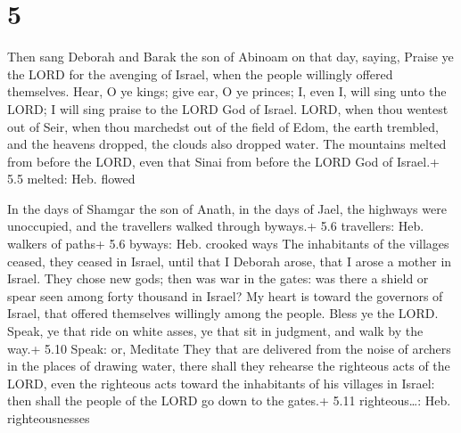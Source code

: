 \hypertarget{section-4}{%
\section{5}\label{section-4}}

 Then sang Deborah and Barak the son of Abinoam on that day,
saying,  Praise ye the LORD for the avenging of Israel, when
the people willingly offered themselves.  Hear, O ye kings;
give ear, O ye princes; I, even I, will sing unto the LORD; I will sing
praise to the LORD God of Israel.  LORD, when thou wentest
out of Seir, when thou marchedst out of the field of Edom, the earth
trembled, and the heavens dropped, the clouds also dropped water.
 The mountains melted from before the LORD, even that Sinai
from before the LORD God of Israel.+ 5.5 melted: Heb. flowed

 In the days of Shamgar the son of Anath, in the days of
Jael, the highways were unoccupied, and the travellers walked through
byways.+ 5.6 travellers: Heb. walkers of paths+ 5.6 byways: Heb. crooked
ways  The inhabitants of the villages ceased, they ceased in
Israel, until that I Deborah arose, that I arose a mother in Israel.
 They chose new gods; then was war in the gates: was there a
shield or spear seen among forty thousand in Israel?  My
heart is toward the governors of Israel, that offered themselves
willingly among the people. Bless ye the LORD.  Speak, ye
that ride on white asses, ye that sit in judgment, and walk by the way.+
5.10 Speak: or, Meditate  They that are delivered from the
noise of archers in the places of drawing water, there shall they
rehearse the righteous acts of the LORD, even the righteous acts toward
the inhabitants of his villages in Israel: then shall the people of the
LORD go down to the gates.+ 5.11 righteous\ldots: Heb. righteousnesses

